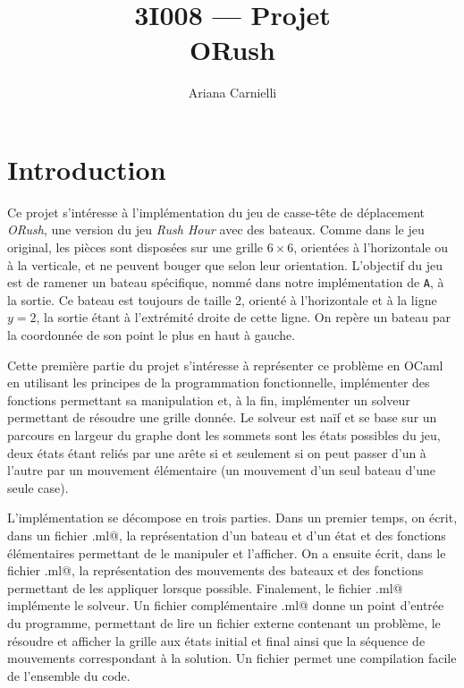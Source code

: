 \documentclass[a4paper,12pt]{article}
\begin{document}
\pagestyle{plain}

\title{3I008 --- Projet \\ ORush}
\author{Ariana Carnielli}
\date{}

\maketitle

\sloppy

\tableofcontents

\section{Introduction}

Ce projet s'intéresse à l'implémentation du jeu de casse-tête de déplacement \emph{ORush}, une version du jeu \emph{Rush Hour} avec des bateaux. Comme dans le jeu original, les pièces sont disposées sur une grille $6 \times 6$, orientées à l'horizontale ou à la verticale, et ne peuvent bouger que selon leur orientation. L'objectif du jeu est de ramener un bateau spécifique, nommé dans notre implémentation de \texttt{A}, à la sortie. Ce bateau est toujours de taille 2, orienté à l'horizontale et à la ligne $y = 2$, la sortie étant à l'extrémité droite de cette ligne. On repère un bateau par la coordonnée de son point le plus en haut à gauche.

Cette première partie du projet s'intéresse à représenter ce problème en OCaml en utilisant les principes de la programmation fonctionnelle, implémenter des fonctions permettant sa manipulation et, à la fin, implémenter un solveur permettant de résoudre une grille donnée. Le solveur est naïf et se base sur un parcours en largeur du graphe dont les sommets sont les états possibles du jeu, deux états étant reliés par une arête si et seulement si on peut passer d'un à l'autre par un mouvement élémentaire (un mouvement d'un seul bateau d'une seule case).

L'implémentation se décompose en trois parties. Dans un premier temps, on écrit, dans un fichier \verb@port.ml@, la représentation d'un bateau et d'un état et des fonctions élémentaires permettant de le manipuler et l'afficher. On a ensuite écrit, dans le fichier \verb@moves.ml@, la représentation des mouvements des bateaux et des fonctions permettant de les appliquer lorsque possible. Finalement, le fichier \verb@solver.ml@ implémente le solveur. Un fichier complémentaire \verb@orush.ml@ donne un point d'entrée du programme, permettant de lire un fichier externe contenant un problème, le résoudre et afficher la grille aux états initial et final ainsi que la séquence de mouvements correspondant à la solution. Un fichier \verb@Makefile@ permet une compilation facile de l'ensemble du code.
\end{document}
